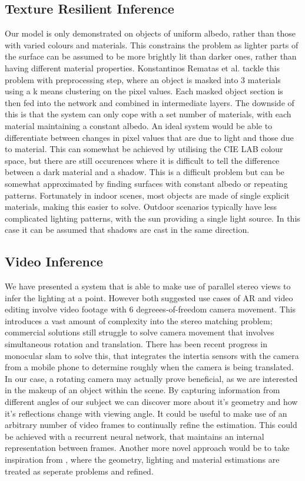 \documentclass[ %
                    author={Gavin Parker},
                supervisor={Dr. Neill Campbell},
                    degree={MEng},
                     title={Deep Siamese Networks for Illumination Estimation from Stereo Images},
                  subtitle={},
                      type={research},
                      year={2018} ]{dissertation}
\begin{document}
\subsection{Texture Resilient Inference}
Our model is only demonstrated on objects of uniform albedo, rather than those with varied colours and materials. This constrains the problem as lighter parts of the surface can be assumed to be more brightly lit than darker ones, rather than having different material properties. Konstantinos Rematas et al. tackle this problem with  preprocessing step, where an object is masked into 3 materials using a k means clustering on the pixel values. Each masked object section is then fed into the network and combined in intermediate layers. The downside of this is that the system can only cope with a set number of materials, with each material maintaining a constant albedo. An ideal system would be able to differentiate between changes in pixel values that are due to light and those due to material. This can somewhat be achieved by utilising the CIE LAB colour space, but there are still occurences where it is difficult to tell the difference between a dark material and a shadow. This is a difficult problem but can be somewhat approximated by finding surfaces with constant albedo or repeating patterns. Fortunately in indoor scenes, most objects are made of single explicit materials, making this easier to solve. Outdoor scenarios typically have less complicated lighting patterns, with the sun providing a single light source. In this case it can be assumed that shadows are cast in the same direction.
\subsection{Video Inference}
We have presented a system that is able to make use of parallel stereo views to infer the lighting at a point. However both suggested use cases of AR and video editing involve video footage with 6 degreees-of-freedom camera movement. This introduces a vast amount of complexity into the stereo matching problem; commercial solutions still struggle to solve camera movement that involves simultaneous rotation and translation. There has been recent progress in monocular slam to solve this, that integrates the intertia sensors with the camera from a mobile phone to determine roughly when the camera is being translated. In our case, a rotating camera may actually prove beneficial, as we are interested in the makeup of an object within the scene. By capturing information from different angles of our subject we can discover more about it's geometry and how it's reflections change with viewing angle. It could be useful to make use of an arbitrary number of video frames to continually refine the estimation. This could be achieved with a recurrent neural network, that maintains an internal representation between frames. \newline
Another more novel approach would be to take inspiration from \cite{Xia:2016:RSS}, where the geometry, lighting and material estimations are treated as seperate problems and refined.
\end{document}

